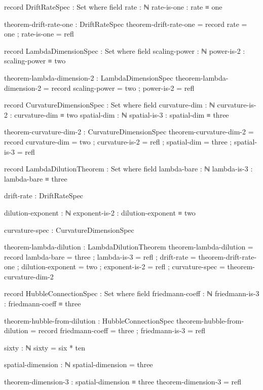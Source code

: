 \documentclass[11pt,a4paper]{book}
\begin{document}
\begin{code}
record DriftRateSpec : Set where
  field
    rate : ℕ
    rate-is-one : rate ≡ one

theorem-drift-rate-one : DriftRateSpec
theorem-drift-rate-one = record
  { rate = one
  ; rate-is-one = refl
  }

record LambdaDimensionSpec : Set where
  field
    scaling-power : ℕ
    power-is-2 : scaling-power ≡ two

theorem-lambda-dimension-2 : LambdaDimensionSpec
theorem-lambda-dimension-2 = record
  { scaling-power = two
  ; power-is-2 = refl
  }

record CurvatureDimensionSpec : Set where
  field
    curvature-dim : ℕ
    curvature-is-2 : curvature-dim ≡ two
    spatial-dim : ℕ
    spatial-is-3 : spatial-dim ≡ three

theorem-curvature-dim-2 : CurvatureDimensionSpec
theorem-curvature-dim-2 = record
  { curvature-dim = two
  ; curvature-is-2 = refl
  ; spatial-dim = three
  ; spatial-is-3 = refl
  }

record LambdaDilutionTheorem : Set where
  field
    lambda-bare : ℕ
    lambda-is-3 : lambda-bare ≡ three
    
    drift-rate : DriftRateSpec
    
    dilution-exponent : ℕ
    exponent-is-2 : dilution-exponent ≡ two
    
    curvature-spec : CurvatureDimensionSpec
    
theorem-lambda-dilution : LambdaDilutionTheorem
theorem-lambda-dilution = record
  { lambda-bare = three
  ; lambda-is-3 = refl
  ; drift-rate = theorem-drift-rate-one
  ; dilution-exponent = two
  ; exponent-is-2 = refl
  ; curvature-spec = theorem-curvature-dim-2
  }

record HubbleConnectionSpec : Set where
  field
    friedmann-coeff : ℕ
    friedmann-is-3 : friedmann-coeff ≡ three

theorem-hubble-from-dilution : HubbleConnectionSpec
theorem-hubble-from-dilution = record
  { friedmann-coeff = three
  ; friedmann-is-3 = refl
  }

sixty : ℕ
sixty = six * ten

spatial-dimension : ℕ
spatial-dimension = three

theorem-dimension-3 : spatial-dimension ≡ three
theorem-dimension-3 = refl
\end{code}
\end{document}
